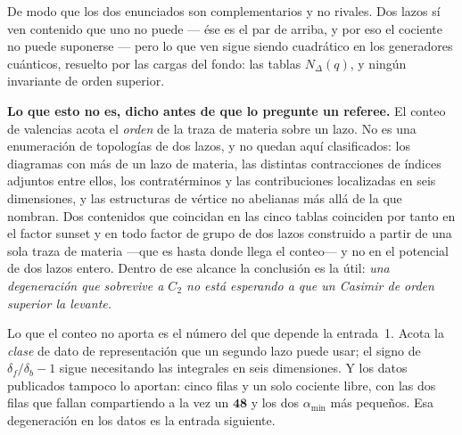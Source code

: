 \documentclass[11pt,a4paper]{article}
\newcommand{\rep}[1]{\mathbf{#1}}
\newcommand{\amin}{\alpha_{\min}}
\begin{document}
De modo que los dos enunciados son complementarios y no rivales. Dos lazos sí ven contenido que uno
no puede --- ése es el par de arriba, y por eso el cociente no puede suponerse --- pero lo que ven
sigue siendo cuadrático en los generadores cuánticos, resuelto por las cargas del fondo: las tablas
$N_\Delta(q)$, y ningún invariante de orden superior.

\textbf{Lo que esto no es, dicho antes de que lo pregunte un referee.} El conteo de valencias acota
el \emph{orden} de la traza de materia sobre un lazo. No es una enumeración de topologías de dos
lazos, y no quedan aquí clasificados: los diagramas con más de un lazo de materia, las distintas
contracciones de índices adjuntos entre ellos, los contratérminos y las contribuciones localizadas
en seis dimensiones, y las estructuras de vértice no abelianas más allá de la que \cite{HMTY}
nombran. Dos contenidos que coincidan en las cinco tablas coinciden por tanto en el factor sunset y
en todo factor de grupo de dos lazos construido a partir de una sola traza de materia ---que es
hasta donde llega el conteo--- y no en el potencial de dos lazos entero. Dentro de ese alcance la
conclusión es la útil: \emph{una degeneración que sobrevive a $C_2$ no está esperando a que un
Casimir de orden superior la levante.}

Lo que el conteo no aporta es el número del que depende la entrada~1. Acota la \emph{clase} de dato
de representación que un segundo lazo puede usar; el signo de $\delta_f/\delta_b-1$ sigue
necesitando las integrales en seis dimensiones. Y los datos publicados tampoco lo aportan: cinco
filas y un solo cociente libre, con las dos filas que fallan compartiendo a la vez un $\rep{48}$ y
los dos $\amin$ más pequeños. Esa degeneración en los datos es la entrada siguiente.
\end{document}

